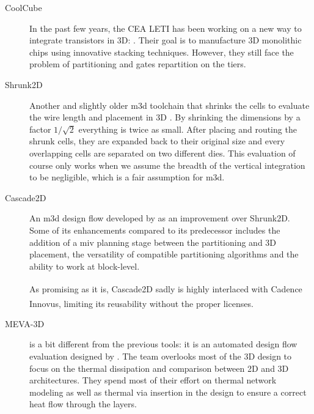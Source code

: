 \documentclass[11pt,a4paper]{report} %
\theoremstyle{customdef}
\begin{document}
\begin{description}
	
	\item[CoolCube] In the past few years, the CEA LETI has been working on a new way to integrate transistors in 3D: \cite{Batude2015, Brunet2016, Clermidy2015, Michailos2016, Vinet2016}.
	Their goal is to manufacture 3D monolithic chips using innovative stacking techniques.
	However, they still face the problem of partitioning and gates repartition on the tiers.

	\item[Shrunk2D] Another and slightly older \gls{m3d} toolchain that shrinks the cells to evaluate the wire length and placement in 3D \citep{Panth}.
	By shrinking the dimensions by a factor $1/\sqrt2$ everything is twice as small.
	After placing and routing the shrunk cells, they are expanded back to their original size and every overlapping cells are separated on two different dies.
	This evaluation of course only works when we assume the breadth of the vertical integration to be negligible, which is a fair assumption for \gls{m3d}.

	\item[Cascade2D] An \gls{m3d} design flow developed by \citet{Chang2016} as an improvement over Shrunk2D.
	Some of its enhancements compared to its predecessor includes the addition of a \gls{miv} planning stage between the partitioning and 3D placement, the versatility of compatible partitioning algorithms and the ability to work at block-level.

	As promising as it is, Cascade2D sadly is highly interlaced with Cadence\textsuperscript{\textregistered} Innovus\textsuperscript{\texttrademark}, limiting its reusability without the proper licenses.

	\item[MEVA-3D] is a bit different from the previous tools: it is an automated design flow evaluation designed by \citet{Cong2006}.
	The team overlooks most of the 3D design to focus on the thermal dissipation and comparison between 2D and 3D architectures.
	They spend most of their effort on thermal network modeling as well as thermal via insertion in the design to ensure a correct heat flow through the layers.
	
	
\end{description}
\end{document}
